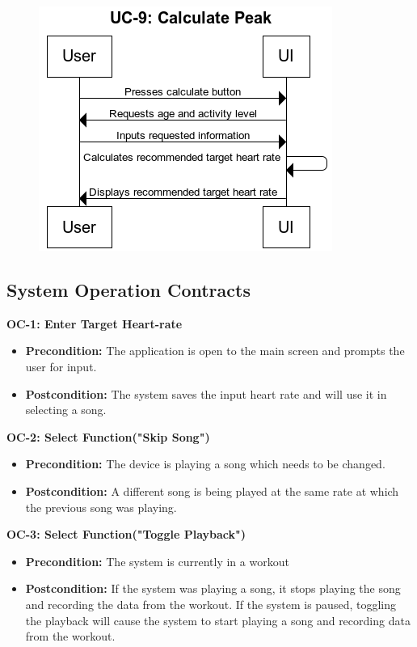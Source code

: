 \documentclass[letterpaper,english, 12pt]{scrreprt}
\begin{document}
\begin{figure}[H]
        \centering
        \includegraphics[width=\textwidth]{img/ssd/ssd_uc9.png}\\
\end{figure}



\subsection{System Operation Contracts}
{\bf OC-1: Enter Target Heart-rate}
\begin{itemize}
        \item {\bf Precondition: } The application is open to the main screen and prompts the user for input.
        \item {\bf Postcondition: } The system saves the input heart rate and will use it in selecting a song.
\end{itemize}

{\bf OC-2: Select Function("Skip Song")}
\begin{itemize}
        \item {\bf Precondition: } The device is playing a song which needs to be changed.
        \item {\bf Postcondition: } A different song is being played at the same rate at which the previous song was playing.

\end{itemize}

{\bf OC-3: Select Function("Toggle Playback")}
\begin{itemize}
        \item {\bf Precondition: } The system is currently in a workout
        \item {\bf Postcondition: } If the system was playing a song, it stops playing the song and recording the data from the workout. If the system is paused, toggling the playback will cause the system to start playing a song and recording data from the workout.

\end{itemize}
\end{document}
